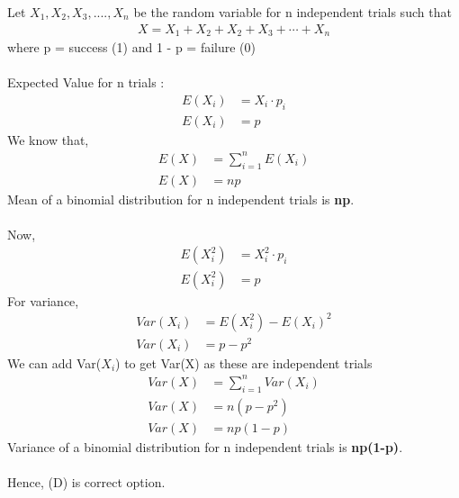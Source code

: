 Let $X_1,X_2,X_3,....,X_n$ be the random variable for n independent trials such that 
\begin{align}
X=X_1 + X_2 + X_2 + X_3 + \cdots + X_n \nonumber 
\end{align}
where p = success (1) and 1 - p = failure (0) \\ \\
Expected Value for n trials : 
\begin{align}
E(X_i) &= X_i\cdot p_i \nonumber\\
E(X_i) &= p
\end{align}
We know that,
\begin{align}
E(X) &= \sum_{i=1}^n E (X_i) \nonumber\\
E(X) &= np
 \end{align}
Mean of a binomial distribution for n independent trials is \textbf{np}.\\ \\
Now,
\begin{align}
E(X_i^2) &= X_i^2\cdot p_i \nonumber\\
E(X_i^2) &= p
\end{align}
For variance,
\begin{align}
    Var(X_i) &= E(X_i^2) - E(X_i)^2 \\
    Var(X_i) &= p - p^2 
    \end{align}
We can add Var($X_i$)  to get Var(X)  as these are independent trials
\begin{align}
Var(X) &= \sum_{i=1}^n Var(X_i) \nonumber \\
Var(X) &= n(p - p^2)\nonumber\\
Var(X) &= np(1-p)
\end{align}
Variance of a binomial distribution for n independent trials is \textbf{np(1-p)}.\\ \\
Hence, (D) is correct option.

